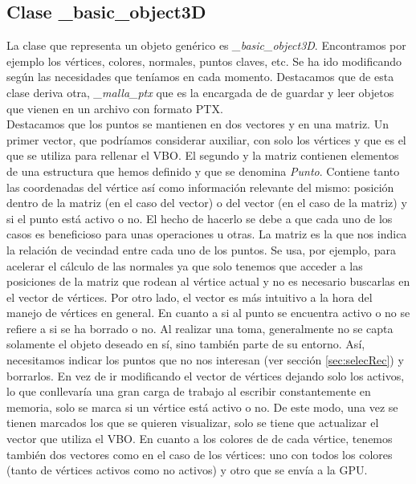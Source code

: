 \subsection{Clase \_basic\_object3D}
La clase que representa un objeto genérico es \textit{\_basic\_object3D}. Encontramos por ejemplo los vértices, colores, normales, puntos claves, etc. Se ha ido modificando según las necesidades que teníamos en cada momento. Destacamos que de esta clase deriva otra, \textit{\_malla\_ptx} que es la encargada de de guardar y leer objetos que vienen en un archivo con formato PTX. \\

Destacamos que los puntos se mantienen en dos vectores y en una matriz. Un primer vector, que podríamos considerar auxiliar, con solo los vértices y que es el que se utiliza para rellenar el VBO. El segundo y la matriz contienen elementos de una estructura que hemos definido y que se denomina \textit{Punto}. Contiene tanto las coordenadas del vértice así como información relevante del mismo: posición dentro de la matriz (en el caso del vector) o del vector (en el caso de la matriz) y si el punto está activo o no. El hecho de hacerlo se debe a que cada uno de los casos es beneficioso para unas operaciones u otras. La matriz es la que nos indica la relación de vecindad entre cada uno de los puntos. Se usa, por ejemplo, para acelerar el cálculo de las normales ya que solo tenemos que acceder a las posiciones de la matriz que rodean al vértice actual y no es necesario buscarlas en el vector de vértices. Por otro lado, el vector es más intuitivo a la hora del manejo de vértices en general. En cuanto a si al punto se encuentra activo o no se refiere a si se ha borrado o no. Al realizar una toma, generalmente no se capta solamente el objeto deseado en sí, sino también parte de su entorno. Así, necesitamos indicar los puntos que no nos interesan (ver sección \ref{sec:selecRec}) y borrarlos. En vez de ir modificando el vector de vértices dejando solo los activos, lo que conllevaría una gran carga de trabajo al escribir constantemente en memoria, solo se marca si un vértice está activo o no. De este modo, una vez se tienen marcados los que se quieren visualizar, solo se tiene que actualizar el vector que utiliza el VBO. En cuanto a los colores de de cada vértice, tenemos también dos vectores como en el caso de los vértices: uno con todos los colores (tanto de vértices activos como no activos) y otro que se envía a la GPU.\\


